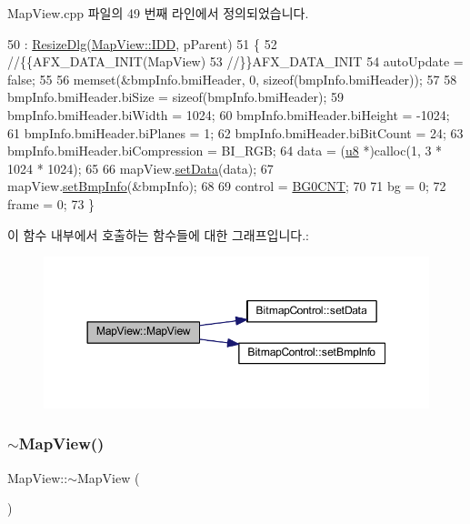 Map\+View.\+cpp 파일의 49 번째 라인에서 정의되었습니다.


\begin{DoxyCode}
50   : \mbox{\hyperlink{class_resize_dlg_a87bab778e9312f274ebe750d4c3a67ee}{ResizeDlg}}(\mbox{\hyperlink{class_map_view_ad398582947c2a9b34e2217a782349299a9bcd3b06eb8616269560902b0a5ca782}{MapView::IDD}}, pParent)
51 \{
52   \textcolor{comment}{//\{\{AFX\_DATA\_INIT(MapView)}
53   \textcolor{comment}{//\}\}AFX\_DATA\_INIT}
54   autoUpdate = \textcolor{keyword}{false};
55   
56   memset(&bmpInfo.bmiHeader, 0, \textcolor{keyword}{sizeof}(bmpInfo.bmiHeader));
57   
58   bmpInfo.bmiHeader.biSize = \textcolor{keyword}{sizeof}(bmpInfo.bmiHeader);
59   bmpInfo.bmiHeader.biWidth = 1024;
60   bmpInfo.bmiHeader.biHeight = -1024;
61   bmpInfo.bmiHeader.biPlanes = 1;
62   bmpInfo.bmiHeader.biBitCount = 24;
63   bmpInfo.bmiHeader.biCompression = BI\_RGB;
64   data = (\mbox{\hyperlink{_system_8h_aed742c436da53c1080638ce6ef7d13de}{u8}} *)calloc(1, 3 * 1024 * 1024);
65 
66   mapView.\mbox{\hyperlink{class_bitmap_control_aa6206183896caf192a37709fa5d7b8d2}{setData}}(data);
67   mapView.\mbox{\hyperlink{class_bitmap_control_a301c52fc62de4368fccdcdc93cefad0b}{setBmpInfo}}(&bmpInfo);
68   
69   control = \mbox{\hyperlink{_globals_8cpp_a6b479219dfffa1ef8c5f2884384b579e}{BG0CNT}};
70 
71   bg = 0;
72   frame = 0;
73 \}
\end{DoxyCode}
이 함수 내부에서 호출하는 함수들에 대한 그래프입니다.\+:
\nopagebreak
\begin{figure}[H]
\begin{center}
\leavevmode
\includegraphics[width=350pt]{class_map_view_ab044e2656406cb180611dd46fa04d9cb_cgraph}
\end{center}
\end{figure}
\mbox{\label{class_map_view_a6c3788b3c08e116287872347b3b0e9f6}} 
\subsubsection{\texorpdfstring{$\sim$\+Map\+View()}{~MapView()}}
{\footnotesize\ttfamily Map\+View\+::$\sim$\+Map\+View (\begin{DoxyParamCaption}{ }\end{DoxyParamCaption})}




